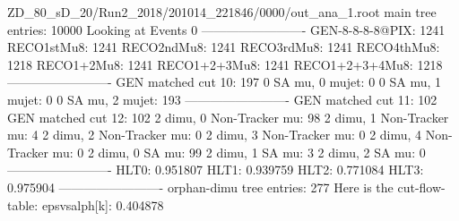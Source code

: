 ZD_80_sD_20/Run2_2018/201014_221846/0000/out_ana_1.root
main tree entries: 10000
Looking at Events 0
-------------------------
GEN-8-8-8-8@PIX: 1241
RECO1stMu8: 1241
RECO2ndMu8: 1241
RECO3rdMu8: 1241
RECO4thMu8: 1218
RECO1+2Mu8: 1241
RECO1+2+3Mu8: 1241
RECO1+2+3+4Mu8: 1218
-------------------------
GEN matched cut 10: 197
0 SA mu, 0 mujet: 0
0 SA mu, 1 mujet: 0
0 SA mu, 2 mujet: 193
-------------------------
GEN matched cut 11: 102
GEN matched cut 12: 102
2 dimu, 0 Non-Tracker mu: 98
2 dimu, 1 Non-Tracker mu: 4
2 dimu, 2 Non-Tracker mu: 0
2 dimu, 3 Non-Tracker mu: 0
2 dimu, 4 Non-Tracker mu: 0
2 dimu, 0 SA mu: 99
2 dimu, 1 SA mu: 3
2 dimu, 2 SA mu: 0
-------------------------
HLT0: 0.951807
HLT1: 0.939759
HLT2: 0.771084
HLT3: 0.975904
-------------------------
orphan-dimu tree entries: 277
Here is the cut-flow-table:
epsvsalph[k]: 0.404878
        
